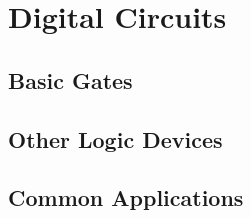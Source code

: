 \chapter{Digital Circuits}
\section{Basic Gates}

\section{Other Logic Devices}

\section{Common Applications}

\newpage

